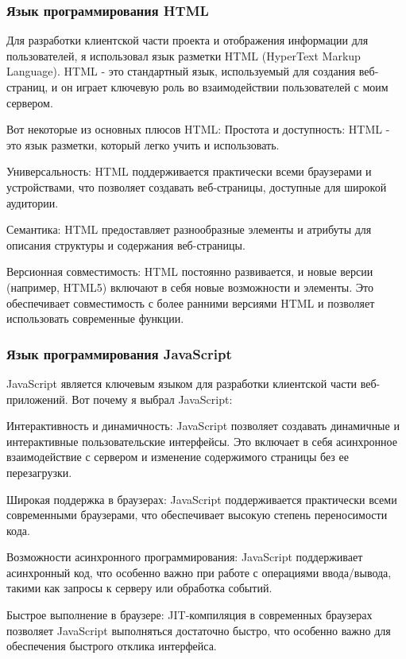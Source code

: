 \subsubsection{Язык программирования HTML}

Для разработки клиентской части проекта и отображения информации для пользователей, я использовал язык разметки HTML (HyperText Markup Language). HTML - это стандартный язык, используемый для создания веб-страниц, и он играет ключевую роль во взаимодействии пользователей с моим сервером.

Вот некоторые из основных плюсов HTML:
Простота и доступность: HTML - это язык разметки, который легко учить и использовать. 

Универсальность: HTML поддерживается практически всеми браузерами и устройствами, что позволяет создавать веб-страницы, доступные для широкой аудитории.

Семантика: HTML предоставляет разнообразные элементы и атрибуты для описания структуры и содержания веб-страницы. 

Версионная совместимость: HTML постоянно развивается, и новые версии (например, HTML5) включают в себя новые возможности и элементы. Это обеспечивает совместимость с более ранними версиями HTML и позволяет использовать современные функции.


\subsubsection{Язык программирования JavaScript}

JavaScript является ключевым языком для разработки клиентской части веб-приложений. Вот почему я выбрал JavaScript:

Интерактивность и динамичность: JavaScript позволяет создавать динамичные и интерактивные пользовательские интерфейсы. Это включает в себя асинхронное взаимодействие с сервером и изменение содержимого страницы без ее перезагрузки.

Широкая поддержка в браузерах: JavaScript поддерживается практически всеми современными браузерами, что обеспечивает высокую степень переносимости кода.

Возможности асинхронного программирования: JavaScript поддерживает асинхронный код, что особенно важно при работе с операциями ввода/вывода, такими как запросы к серверу или обработка событий.

Быстрое выполнение в браузере: JIT-компиляция в современных браузерах позволяет JavaScript выполняться достаточно быстро, что особенно важно для обеспечения быстрого отклика интерфейса.

